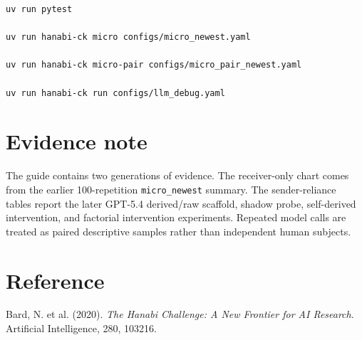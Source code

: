 \documentclass[11pt,a4paper]{article}
\begin{document}
\begin{lstlisting}[language=bash]
uv run pytest

uv run hanabi-ck micro configs/micro_newest.yaml

uv run hanabi-ck micro-pair configs/micro_pair_newest.yaml

uv run hanabi-ck run configs/llm_debug.yaml
\end{lstlisting}

\section*{Evidence note}
The guide contains two generations of evidence. The receiver-only chart comes
from the earlier 100-repetition \texttt{micro\_newest} summary. The
sender-reliance tables report the later GPT-5.4 derived/raw scaffold, shadow
probe, self-derived intervention, and factorial intervention experiments.
Repeated model calls are treated as paired descriptive samples rather than
independent human subjects.

\section*{Reference}
Bard, N. et al. (2020). \emph{The Hanabi Challenge: A New Frontier for AI Research}. Artificial Intelligence, 280, 103216.
\end{document}
